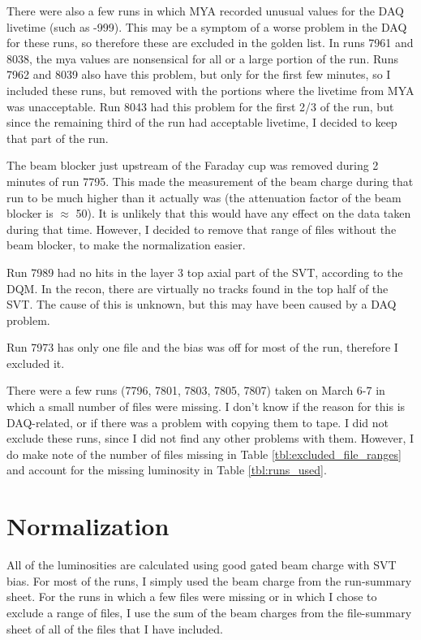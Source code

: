 \documentclass[11pt]{article}
\begin{document}
 

There were also a few runs in which MYA recorded unusual values for the DAQ livetime (such as -999).  This may be a symptom of a worse problem in the DAQ for these runs, so therefore these are excluded in the golden list.  In runs 7961 and 8038, the mya values are nonsensical for all or a large portion of the run.  Runs 7962 and 8039 also have this problem, but only for the first few minutes, so I included these runs, but removed with the portions where the livetime from MYA was unacceptable.  Run 8043 had this problem for the first 2/3 of the run, but since the remaining third of the run had acceptable livetime, I decided to keep that part of the run.  

The beam blocker just upstream of the Faraday cup was removed during 2 minutes of run 7795.  This made the measurement of the beam charge during that run to be much higher than it actually was (the attenuation factor of the beam blocker is $\approx$ 50).   It is unlikely that this would have any effect on the data taken during that time.  However, I decided to remove that range of files without the beam blocker, to make the normalization easier.  

Run 7989 had no hits in the layer 3 top axial part of the SVT, according to the DQM.  In the recon, there are virtually no tracks found in the top half of the SVT.  The cause of this is unknown, but this may have been caused by a DAQ problem.  

Run 7973 has only one file and the bias was off for most of the run, therefore I excluded it.  

There were a few runs (7796, 7801, 7803, 7805, 7807) taken on March 6-7 in which a small number of files were missing.  I don't know if the reason for this is DAQ-related, or if there was a problem with copying them to tape.  I did not exclude these runs, since I did not find any other problems with them.  However, I do make note of the number of files missing in Table \ref{tbl:excluded_file_ranges} and account for the missing luminosity in Table \ref{tbl:runs_used}.  

\section{Normalization}
All of the luminosities are calculated using good gated beam charge with SVT bias.  For most of the runs, I simply used the beam charge from the run-summary sheet.  For the runs in which a few files were missing or in which I chose to exclude a range of files, I use the sum of the beam charges from the file-summary sheet of all of the files that I have included.  
\end{document}
